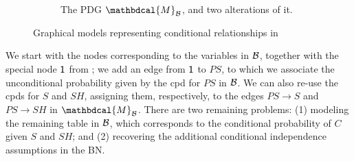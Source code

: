 \documentclass{article}
\theoremstyle{plain}
\theoremstyle{definition}
\theoremstyle{remark}
\newcommand{\dg}[1]{\mathbdcal{#1}}
\newcommand{\PDGof}[1]{{\dg M}_{#1}}
\numberwithin{equation}{section}
\begin{document}
\begin{example}[emulating a BN]
\begin{figure*}[ht!]
\begin{subfigure}[b]{0.57\textwidth}
{}

\caption{The PDG $\PDGof{{\mathcal B}}$, and two alterations of it.} 
		\label{subfig:smoking-pdg}
	\end{subfigure}

    \caption{Graphical models representing conditional relationships in }
	\label{fig:smoking-bn+pdg}
\end{figure*}
		
We start with the nodes corresponding to the variables in $\cal B$, together
with the special node $\sf 1$ from ; we add an edge
from ${\sf 1}$ to $\mathit{PS}$, to which we associate the unconditional
probability given by the cpd for $\mathit{PS}$ in $\cal B$. We can also re-use
the cpds for $S$ and $\mathit{SH}$, assigning them, respectively, to the edges
$PS \to S$ and $PS \to SH$ in $\PDGof{{\mathcal B}}$.
There are two remaining problems: (1) modeling the remaining table in $\cal B$,
which corresponds to the conditional probability of $C$ given $S$ and $SH$; and
(2) recovering the additional
conditional
independence assumptions in the BN. 


\end{example}
\end{document}
